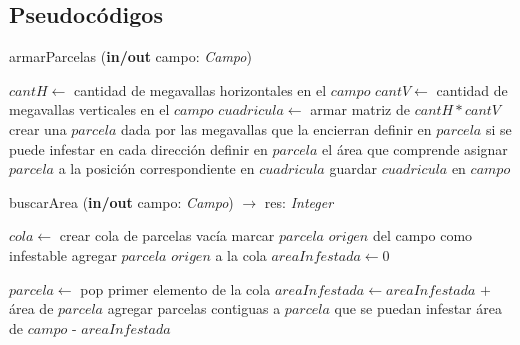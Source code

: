 \clearpage


\subsection{Pseudocódigos}

\begin{algorithm}
\caption{armarParcelas (\textbf{in/out} campo: \textsl{Campo})}
\begin{algorithmic}[1]

\STATE $cantH \leftarrow$ cantidad de megavallas horizontales en el $campo$
\STATE $cantV \leftarrow$ cantidad de megavallas verticales en el $campo$
\STATE $cuadricula \leftarrow$ armar matriz de $cantH*cantV$
		\STATE crear una $parcela$ dada por las megavallas que la encierran
		\STATE definir en $parcela$ si se puede infestar en cada dirección
		\STATE definir en $parcela$ el área que comprende
		\STATE asignar $parcela$ a la posición correspondiente en $cuadricula$
	\ENDWHILE
\ENDWHILE
\STATE guardar $cuadricula$ en $campo$
\end{algorithmic}
\end{algorithm}

\begin{algorithm}
\caption{buscarArea (\textbf{in/out} campo: \textsl{Campo}) $\rightarrow$ res: \textsl{Integer}}
\begin{algorithmic}[1]

\STATE $cola \leftarrow$ crear cola de parcelas vacía
\STATE marcar $parcela$ $origen$ del campo como infestable
\STATE agregar $parcela$ $origen$ a la cola
\STATE $areaInfestada \leftarrow 0$

	\STATE $parcela \leftarrow$ pop primer elemento de la cola
	\STATE $areaInfestada \leftarrow areaInfestada$ $+$ área de $parcela$ 
	\STATE agregar parcelas contiguas a $parcela$ que se puedan infestar
\ENDWHILE
\RETURN área de $campo$ - $areaInfestada$
\end{algorithmic}
\end{algorithm}

\clearpage

